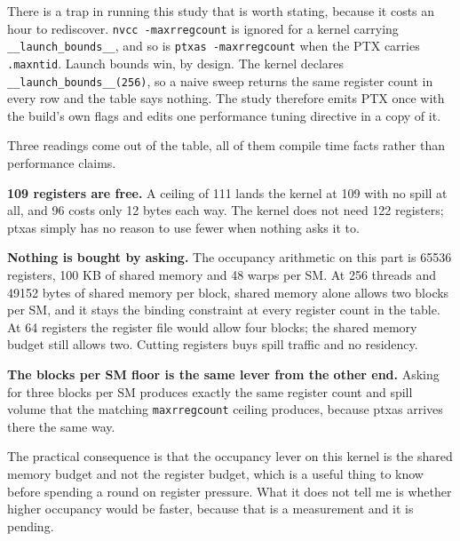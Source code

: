 There is a trap in running this study that is worth stating, because it costs an
hour to rediscover. \texttt{nvcc -maxrregcount} is ignored for a kernel carrying
\texttt{\_\_launch\_bounds\_\_}, and so is \texttt{ptxas -maxrregcount} when the
PTX carries \texttt{.maxntid}. Launch bounds win, by design. The kernel declares
\texttt{\_\_launch\_bounds\_\_(256)}, so a naive sweep returns the same register
count in every row and the table says nothing. The study therefore emits PTX once
with the build's own flags and edits one performance tuning directive in a copy of
it.

Three readings come out of the table, all of them compile time facts rather than
performance claims.

\textbf{109 registers are free.} A ceiling of 111 lands the kernel at 109 with no
spill at all, and 96 costs only 12 bytes each way. The kernel does not need 122
registers; ptxas simply has no reason to use fewer when nothing asks it to.

\textbf{Nothing is bought by asking.} The occupancy arithmetic on this part is
65536 registers, 100 KB of shared memory and 48 warps per SM. At 256 threads and
49152 bytes of shared memory per block, shared memory alone allows two blocks per
SM, and it stays the binding constraint at every register count in the table. At
64 registers the register file would allow four blocks; the shared memory budget
still allows two. Cutting registers buys spill traffic and no residency.

\textbf{The blocks per SM floor is the same lever from the other end.} Asking for
three blocks per SM produces exactly the same register count and spill volume that
the matching \texttt{maxrregcount} ceiling produces, because ptxas arrives there
the same way.

The practical consequence is that the occupancy lever on this kernel is the shared
memory budget and not the register budget, which is a useful thing to know before
spending a round on register pressure. What it does not tell me is whether higher
occupancy would be faster, because that is a measurement and it is pending.
